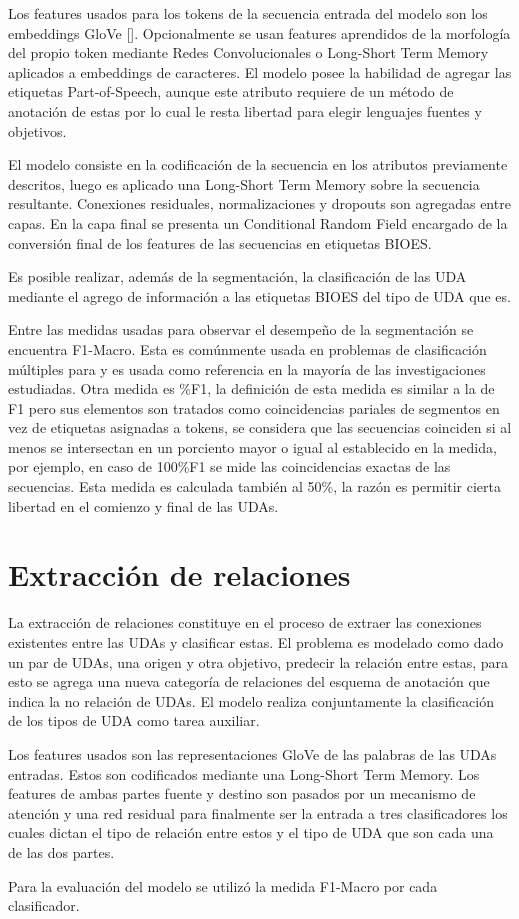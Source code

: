 Los features usados para los tokens de la secuencia entrada del modelo son los embeddings
GloVe [\cite{pennington2014glove}]. Opcionalmente se usan features aprendidos de la morfología
del propio token mediante Redes Convolucionales o Long-Short Term Memory aplicados a embeddings
de caracteres. El modelo posee la habilidad de agregar las etiquetas Part-of-Speech, aunque este
atributo requiere de un método de anotación de estas por lo cual le resta libertad para
elegir lenguajes fuentes y objetivos.

El modelo consiste en la codificación de la secuencia en los atributos previamente descritos,
luego es aplicado una Long-Short Term Memory sobre la secuencia resultante. Conexiones residuales, 
normalizaciones y dropouts son agregadas entre capas. En la capa final se presenta un Conditional
Random Field encargado de la conversión final de los features de las secuencias en etiquetas BIOES.

Es posible realizar, además de la segmentación, la clasificación de las UDA mediante el agrego de
información a las etiquetas BIOES del tipo de UDA que es.

Entre las medidas usadas para observar el desempeño de la segmentación se encuentra F1-Macro.
Esta es comúnmente usada en problemas de clasificación múltiples para y es usada como referencia
en la mayoría de las investigaciones estudiadas. Otra medida es \%F1, la definición de esta medida
es similar a la de F1 pero sus elementos son tratados como coincidencias pariales de segmentos en vez
de etiquetas asignadas a tokens, se considera que las secuencias coinciden si al menos se intersectan 
en un porciento mayor o igual al establecido en la medida, por ejemplo, en caso de 100\%F1 se mide
las coincidencias exactas de las secuencias. Esta medida es calculada también al 50\%, la razón es
permitir cierta libertad en el comienzo y final de las UDAs. 

\section{Extracción de relaciones}

La extracción de relaciones constituye en el proceso de extraer las conexiones existentes
entre las UDAs y clasificar estas. El problema es modelado como dado un par de UDAs, una origen
y otra objetivo, predecir
la relación entre estas, para esto se agrega una nueva categoría de relaciones del esquema de
anotación que indica la no relación de UDAs. El modelo realiza conjuntamente la clasificación
de los tipos de UDA como tarea auxiliar.

Los features usados son las representaciones GloVe de las palabras de las UDAs entradas. 
Estos son codificados mediante una Long-Short Term Memory. Los features de ambas partes
fuente y destino son pasados por un mecanismo de atención y una red residual para finalmente
ser la entrada a tres clasificadores los cuales dictan el tipo de relación entre estos y el tipo
de UDA que son cada una de las dos partes.

Para la evaluación del modelo se utilizó la medida F1-Macro por cada clasificador.